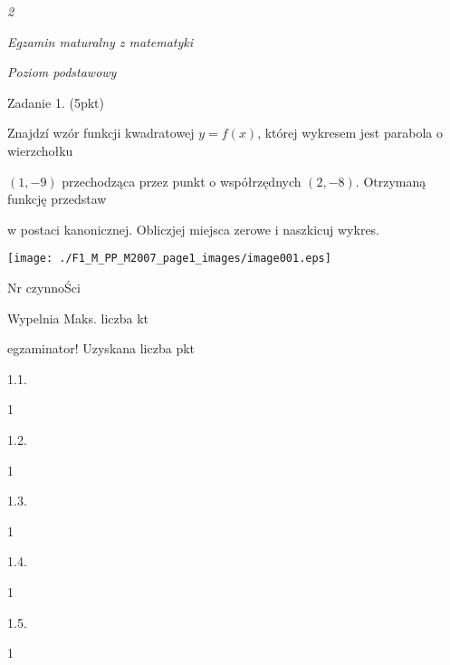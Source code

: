 \documentclass[a4paper,12pt]{article}
\begin{document}
{\it 2}

{\it Egzamin maturalny z matematyki}

{\it Poziom podstawowy}

Zadanie 1. (5pkt)

Znajdzí wzór funkcji kwadratowej $y=f(x)$, której wykresem jest parabola o wierzchołku

$(1,-9)$ przechodząca przez punkt o współrzędnych $(2,-8)$. Otrzymaną funkcję przedstaw

w postaci kanonicznej. Obliczjej miejsca zerowe i naszkicuj wykres.
\begin{center}
\texttt{[image: ./F1\_M\_PP\_M2007\_page1\_images/image001.eps]}
\end{center}
Nr czynnoŚci

Wypelnia Maks. liczba kt

egzaminator! Uzyskana liczba pkt

1.1.

1

1.2.

1

1.3.

1

1.4.

1

1.5.

1
\end{document}
